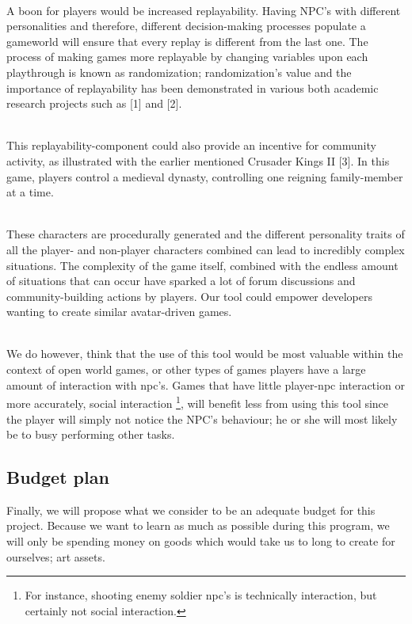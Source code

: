 \documentclass[11pt]{article}
\begin{document}
~\\
A boon for players would be increased replayability. Having NPC's with different personalities and therefore, different decision-making processes populate a gameworld will ensure that every replay is different from the last one. The process of making games more replayable by changing variables upon each playthrough is known as randomization; randomization's value and the importance of replayability has been demonstrated in various both academic research projects such as [1] and [2].

~\\
This replayability-component could also provide an incentive for community activity, as illustrated with the earlier mentioned Crusader Kings II [3]. In this game, players control a medieval dynasty, controlling one reigning family-member at a time. 

~\\
These characters are procedurally generated and the different personality traits of all the player- and non-player characters combined can lead to incredibly complex situations. The complexity of the game itself, combined with the endless amount of situations that can occur have sparked a lot of forum discussions and community-building actions by players. Our tool could empower developers wanting to create similar avatar-driven games.

~\\
We do however, think that the use of this tool would be most valuable within the context of open world games, or other types of games players have a large amount of interaction with npc's. Games that have little player-npc interaction or more accurately, social interaction \footnote{For instance, shooting enemy soldier npc's is technically interaction, but certainly not social interaction.}, will benefit less from using this tool since the player will simply not notice the NPC's behaviour; he or she will most likely be to busy performing other tasks.


\newpage
{}
{}
\subsection*{Budget plan}
Finally, we will propose what we consider to be an adequate budget for this project. Because we want to learn as much as possible during this program, we will only be spending money on goods which would take us to long to create for ourselves; art assets. 
\end{document}
